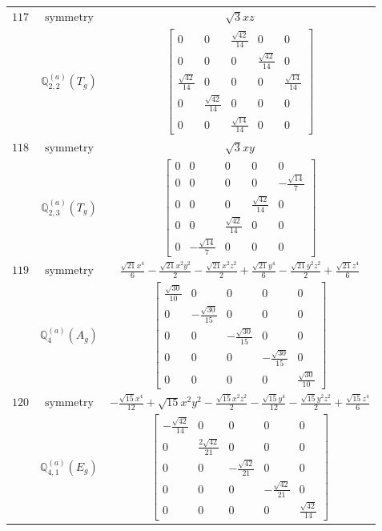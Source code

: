 \documentclass[fleqn,8pt,landscape]{jsarticle}
\begin{document}
\begin{longtable}{ccc}
$ 117 $ & $ \text{symmetry} $ & $ \sqrt{3} x z $ \\
$  $ & $ \mathbb{Q}_{2,2}^{(a)}(T_{g}) $ & $ \begin{bmatrix} 0 & 0 & \frac{\sqrt{42}}{14} & 0 & 0 \\ 0 & 0 & 0 & \frac{\sqrt{42}}{14} & 0 \\ \frac{\sqrt{42}}{14} & 0 & 0 & 0 & \frac{\sqrt{14}}{14} \\ 0 & \frac{\sqrt{42}}{14} & 0 & 0 & 0 \\ 0 & 0 & \frac{\sqrt{14}}{14} & 0 & 0 \end{bmatrix} $ \\ \hline
$ 118 $ & $ \text{symmetry} $ & $ \sqrt{3} x y $ \\
$  $ & $ \mathbb{Q}_{2,3}^{(a)}(T_{g}) $ & $ \begin{bmatrix} 0 & 0 & 0 & 0 & 0 \\ 0 & 0 & 0 & 0 & - \frac{\sqrt{14}}{7} \\ 0 & 0 & 0 & \frac{\sqrt{42}}{14} & 0 \\ 0 & 0 & \frac{\sqrt{42}}{14} & 0 & 0 \\ 0 & - \frac{\sqrt{14}}{7} & 0 & 0 & 0 \end{bmatrix} $ \\ \hline
$ 119 $ & $ \text{symmetry} $ & $ \frac{\sqrt{21} x^{4}}{6} - \frac{\sqrt{21} x^{2} y^{2}}{2} - \frac{\sqrt{21} x^{2} z^{2}}{2} + \frac{\sqrt{21} y^{4}}{6} - \frac{\sqrt{21} y^{2} z^{2}}{2} + \frac{\sqrt{21} z^{4}}{6} $ \\
$  $ & $ \mathbb{Q}_{4}^{(a)}(A_{g}) $ & $ \begin{bmatrix} \frac{\sqrt{30}}{10} & 0 & 0 & 0 & 0 \\ 0 & - \frac{\sqrt{30}}{15} & 0 & 0 & 0 \\ 0 & 0 & - \frac{\sqrt{30}}{15} & 0 & 0 \\ 0 & 0 & 0 & - \frac{\sqrt{30}}{15} & 0 \\ 0 & 0 & 0 & 0 & \frac{\sqrt{30}}{10} \end{bmatrix} $ \\ \hline
$ 120 $ & $ \text{symmetry} $ & $ - \frac{\sqrt{15} x^{4}}{12} + \sqrt{15} x^{2} y^{2} - \frac{\sqrt{15} x^{2} z^{2}}{2} - \frac{\sqrt{15} y^{4}}{12} - \frac{\sqrt{15} y^{2} z^{2}}{2} + \frac{\sqrt{15} z^{4}}{6} $ \\
$  $ & $ \mathbb{Q}_{4,1}^{(a)}(E_{g}) $ & $ \begin{bmatrix} - \frac{\sqrt{42}}{14} & 0 & 0 & 0 & 0 \\ 0 & \frac{2 \sqrt{42}}{21} & 0 & 0 & 0 \\ 0 & 0 & - \frac{\sqrt{42}}{21} & 0 & 0 \\ 0 & 0 & 0 & - \frac{\sqrt{42}}{21} & 0 \\ 0 & 0 & 0 & 0 & \frac{\sqrt{42}}{14} \end{bmatrix} $ \\ \hline

\end{longtable}
\end{document}
